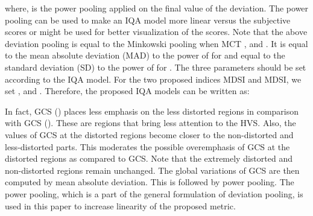 where,  is the power pooling applied on the final value of the deviation. The power pooling can be used to make an IQA model more linear versus the subjective scores or might be used for better visualization of the scores. Note that the above deviation pooling is equal to the Minkowski pooling \cite{spatial2006} when MCT ,  and . It is equal to the mean absolute deviation (MAD) to the power of  for  and equal to the standard deviation (SD) to the power of  for . The three parameters should be set according to the IQA model. For the two proposed indices MDSI and MDSI, we set ,  and . Therefore, the proposed IQA models can be written as:
                    
                    


In fact, GCS () places less emphasis on the less distorted regions in comparison with GCS (). These are regions that bring less attention to the HVS. Also, the values of GCS at the distorted regions become closer to the non-distorted and less-distorted parts. This moderates the possible overemphasis of GCS at the distorted regions as compared to GCS. Note that the extremely distorted and non-distorted regions remain unchanged. The global variations of GCS are then computed by mean absolute deviation. This is followed by power pooling. The power pooling, which is a part of the general formulation of deviation pooling, is used in this paper to increase linearity of the proposed metric.   






